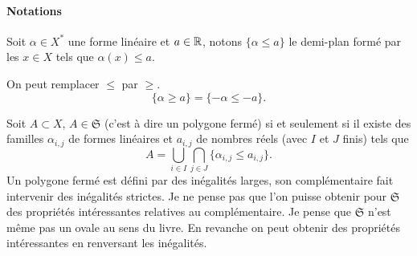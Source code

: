 \paragraph{Notations}
\label{sec:notpolygones}
Soit $\alpha \in X^*$ une forme linéaire et $a\in \mathbb{R}$, notons $\{ \alpha \leq a\}$ le demi-plan formé par les $x \in X$ tels que $\alpha(x) \leq a$.


\begin{rem} On peut remplacer $\leq$ par $\geq$.
 \begin{displaymath}
   \{ \alpha \geq a \} = \{ -\alpha \leq -a \}.
 \end{displaymath}
\end{rem}

Soit $A\subset X$, $A \in \mathfrak{S}$ (c'est à dire un polygone fermé) si et seulement si il existe des familles $\alpha_{i,j}$ de formes linéaires et $a_{i,j}$ de nombres réels (avec $I$ et $J$ finis) tels que
\begin{displaymath}
 A = \bigcup_{i \in I} \bigcap_{j \in J}\{ \alpha_{i,j} \leq a_{i,j}\}.
\end{displaymath}
Un polygone fermé est défini par des inégalités larges, son complémentaire fait intervenir des inégalités strictes. Je ne pense pas que l'on puisse obtenir pour $\mathfrak{S}$ des propriétés intéressantes relatives au complémentaire. Je pense que $\mathfrak{S}$ n'est même pas un ovale au sens du livre.\newline
En revanche on peut obtenir des propriétés intéressantes en renversant les inégalités.


